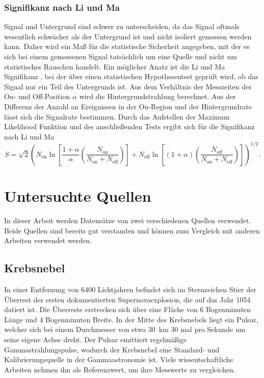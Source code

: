 \subsection*{Signifikanz nach Li und Ma}
Signal und Untergrund sind schwer zu unterscheiden, da das Signal oftmals wesentlich schwächer als der Untergrund ist und nicht isoliert gemessen werden kann. 
Daher wird ein Maß für die statistische Sicherheit angegeben, mit der es sich bei einem gemessenen Signal tatsächlich um eine Quelle und nicht um statistisches Rauschen handelt.
Ein möglicher Anatz ist die Li und Ma Signifikanz \cite{liandma}, bei der über einen statistischen Hypothesentest geprüft wird, ob das Signal nur ein Teil des Untergrunds ist. 
Aus dem Verhältnis der Messzeiten der On- und Off-Position $\alpha$ wird die Hintergrundstrahlung berechnet. 
Aus der Differenz der Anzahl an Ereignissen in der On-Region und der Hintergrundrate lässt sich die Signalrate bestimmen. 
Durch das Aufstellen der Maximum Likelihood Funktion und des anschließenden Tests ergibt sich für die Signifikanz nach Li und Ma
\begin{equation}
S = \sqrt{2} \left( N_\text{on} \ln \left[ \frac{1+ \alpha}{\alpha}\left( \frac{N_\text{on}}{N_\text{on} + N_\text{off}} \right) \right] + N_\text{off} \ln \left[ \left( 1+ \alpha \right) \left( \frac{N_\text{off}}{N_\text{on} + N_\text{off}} \right) \right] \right)^{1/2}.
\end{equation}

\chapter{Untersuchte Quellen}
In dieser Arbeit werden Datensätze von zwei verschiedenen Quellen verwendet. 
Beide Quellen sind bereits gut verstanden und können zum Vergleich mit anderen Arbeiten verwendet werden.
\section{Krebsnebel}
In einer Entfernung von 6400 Lichtjahren befindet sich im Sternzeichen Stier der Überrest der ersten dokumentierten Supernovaexplosion, die auf das Jahr 1054 datiert ist. 
Die Überreste erstrecken sich über eine Fläche von 6 Bogenminuten Länge und 4 Bogenminuten Breite. 
In der Mitte des Krebsnebels liegt ein Pulsar, welcher sich bei einem Durchmesser von etwa \SI{30}{\kilo \meter} 30 mal pro Sekunde um seine eigene Achse dreht.
Der Pulsar emittiert regelmäßige Gammastrahlungspulse, wodurch der Krebsnebel eine Standard- und Kalibrierungsquelle in der Gammaastronomie ist.
Viele wissentschaftliche Arbeiten nehmen ihn als Referenzwert, um ihre Messwerte zu vergleichen. 

